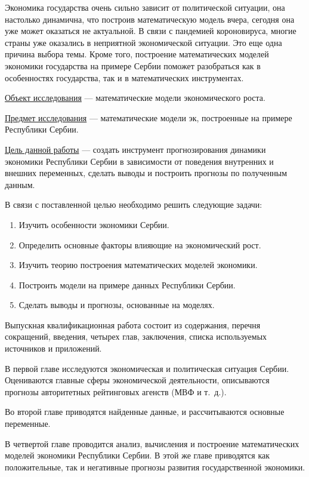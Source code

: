 Экономика государства очень сильно зависит от политической ситуации, она настолько динамична, что построив математическую модель вчера, сегодня она уже может оказаться не актуальной. В связи с пандемией короновируса, многие страны уже оказались в неприятной экономической ситуации.
Это еще одна причина выбора темы.
Кроме того, построение математических моделей экономики государства на примере Сербии поможет разобраться как в особенностях государства, так и в математических инструментах.

\underline{Объект исследования} --- математические модели экономического роста.

\underline{Предмет исследования} --- математические модели эк, построенные на примере Республики Сербии.

\underline{Цель данной работы} --- создать инструмент прогнозирования динамики экономики Республики Сербии в зависимости от поведения внутренних и внешних переменных, сделать выводы и построить прогнозы по полученным данным.

В связи с поставленной целью необходимо решить следующие задачи:
\begin{enumerate}
	\item Изучить особенности экономики Сербии.
	\item Определить основные факторы влияющие на экономический рост.
	\item Изучить теорию построения математических моделей экономики.
	\item Построить модели на примере данных Республики Сербии.
	\item Сделать выводы и прогнозы, основанные на моделях.
\end{enumerate}

Выпускная квалификационная работа состоит из содержания, перечня сокращений, введения, четырех глав, заключения, списка используемых источников и приложений.

В первой главе исследуются экономическая и политическая ситуация Сербии. Оцениваются главные сферы экономической деятельности, описываются прогнозы авторитетных рейтинговых агенств (МВФ и т.~д.).

Во второй главе приводятся найденные данные, и рассчитываются основные переменные.

В четвертой главе проводится анализ, вычисления и построение математических моделей экономики Республики Сербии. В этой же главе приводятся как положительные, так и негативные прогнозы развития государственной экономики.

